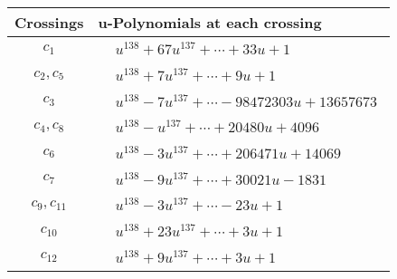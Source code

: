 \documentclass[1p]{elsarticle_modified}
\theoremstyle{definition}
\begin{document}
\begin{tabular}{m{50pt}|m{274pt}}
Crossings & \hspace{64pt}u-Polynomials at each crossing \\
\hline $$\begin{aligned}c_{1}\end{aligned}$$&$\begin{aligned}
&u^{138}+67 u^{137}+\cdots+33 u+1
\end{aligned}$\\
\hline $$\begin{aligned}c_{2},c_{5}\end{aligned}$$&$\begin{aligned}
&u^{138}+7 u^{137}+\cdots+9 u+1
\end{aligned}$\\
\hline $$\begin{aligned}c_{3}\end{aligned}$$&$\begin{aligned}
&u^{138}-7 u^{137}+\cdots-98472303 u+13657673
\end{aligned}$\\
\hline $$\begin{aligned}c_{4},c_{8}\end{aligned}$$&$\begin{aligned}
&u^{138}- u^{137}+\cdots+20480 u+4096
\end{aligned}$\\
\hline $$\begin{aligned}c_{6}\end{aligned}$$&$\begin{aligned}
&u^{138}-3 u^{137}+\cdots+206471 u+14069
\end{aligned}$\\
\hline $$\begin{aligned}c_{7}\end{aligned}$$&$\begin{aligned}
&u^{138}-9 u^{137}+\cdots+30021 u-1831
\end{aligned}$\\
\hline $$\begin{aligned}c_{9},c_{11}\end{aligned}$$&$\begin{aligned}
&u^{138}-3 u^{137}+\cdots-23 u+1
\end{aligned}$\\
\hline $$\begin{aligned}c_{10}\end{aligned}$$&$\begin{aligned}
&u^{138}+23 u^{137}+\cdots+3 u+1
\end{aligned}$\\
\hline $$\begin{aligned}c_{12}\end{aligned}$$&$\begin{aligned}
&u^{138}+9 u^{137}+\cdots+3 u+1
\end{aligned}$\\
\hline
\end{tabular}\\~\\
\end{document}
